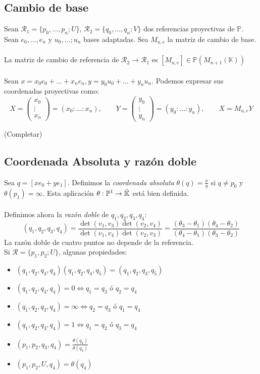 \documentclass{myclass}
\newcommand{\K}{\mathbb{K}}
\renewcommand{\P}{\mathbb{P}}
\newcommand{\Rcal}{\mathcal{R}}
\begin{document}
\subsection{Cambio de base}
Sean $\Rcal_1 = \{p_0, \ldots, p_n; U\}$, $\Rcal_2 = \{q_0, \ldots, q_n; V\}$ dos referencias proyectivas de $\P$. Sean $e_0, \ldots, e_n$ y $u_0, \ldots;u_n$ bases adaptadas. Sea $M_{u,e}$ la matriz de cambio de base. \\
\\
La matriz de cambio de referencia de $\Rcal_2\to \Rcal_1$ es $[M_{u, e}]\in \P(M_{n+1}(\mathbb{K}))$\\
\\
Sean $x = x_0e_0 + \ldots + x_ne_n, y = y_0u_0 + \ldots + y_nu_n$. Podemos expresar sus coordenadas proyectivas como:
$$
X = \begin{pmatrix} x_0 \\ \vdots \\ x_n \end{pmatrix} = (x_0:\ldots:x_n) , \qquad Y = \begin{pmatrix} y_0 \\ \vdots \\ y_n \end{pmatrix} = (y_0:\ldots:y_n), \qquad X = M_{u, e}Y
$$

(Completar)

\subsection{Coordenada Absoluta y razón doble}
Sea $q = [xe_0 + ye_1]$. Definimos la \textit{coordenada absoluta} $\theta(q) = \frac{x}{y}$ si $q\neq p_0$ y $\theta(p_1) = \infty$. Esta aplicación $\theta :\P^1 \to \Bar{\K}$ está bien definida. \\
\\
Definimos ahora la \textit{razón doble} de $q_1, q_2, q_3, q_4$:
$$
(q_1, q_2, q_3, q_4) = \frac{\det(v_1, v_3) \det(v_2, v_4)}{\det(v_1, v_4) \det(v_2, v_3)} = \frac{(\theta_3 - \theta_1)(\theta_4-\theta_2)}{(\theta_4 - \theta_1)(\theta_3 - \theta_2)}
$$
La razón doble de cuatro puntos no depende de la referencia. \\
Si $\Rcal=\{p_1, p_2;U\}$, algunas propiedades:
\begin{itemize}
 \item $(q_1, q_2, q_3, q_4)(q_1, q_2, q_4, q_5) = (q_1, q_2, q_3, q_5)$
 \item $(q_1, q_2, q_3, q_4) = 0 \iff q_1 = q_3$ ó $q_2 = q_4$
 \item $(q_1, q_2, q_3, q_4) = \infty \iff q_2 = q_3$ ó $q_1 = q_4$
 \item $(q_1, q_2, q_3, q_4) = 1 \iff q_1 = q_2$ ó $q_3 = q_4$
 \item $(p_1, p_2, q_3, q_4)=\frac{\theta(q_4)}{\theta(q_3)}$  
 \item $(p_1, p_2, U, q_4)=\theta(q_4)$
\end{itemize}
\end{document}
